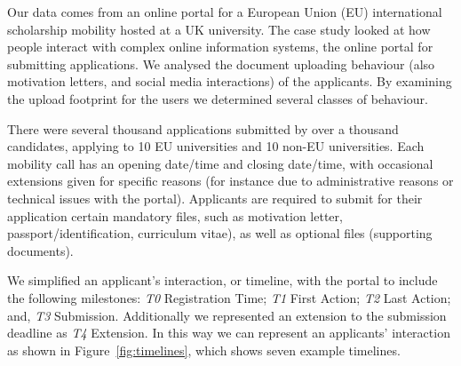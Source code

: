 \documentclass{AISB2008}
\begin{document}
Our data comes from an online portal for a European Union (EU)
international scholarship mobility hosted at a UK university. The case
study looked at how people interact with complex online information
systems, the online portal for submitting applications. We analysed
the document uploading behaviour (also motivation letters, and social
media interactions) of the applicants. By examining the upload
footprint for the users we determined several classes of behaviour.

There were several thousand applications submitted by over a thousand
candidates, applying to 10 EU universities and 10 non-EU
universities. Each mobility call has an opening date/time and closing
date/time, with occasional extensions given for specific reasons (for
instance due to administrative reasons or technical issues with the
portal). Applicants are required to submit for their application
certain mandatory files, such as motivation letter,
passport/identification, curriculum vitae), as well as optional files
(supporting documents).

We simplified an applicant's interaction, or timeline, with the portal
to include the following milestones: {\emph{T0}} Registration Time;
{\emph{T1}} First Action; {\emph{T2}} Last Action; and, {\emph{T3}}
Submission. Additionally we represented an extension to the submission
deadline as {\emph{T4}} Extension. In this way we can represent an
applicants’ interaction as shown in Figure~\ref{fig:timelines}, which
shows seven example timelines.
\end{document}

